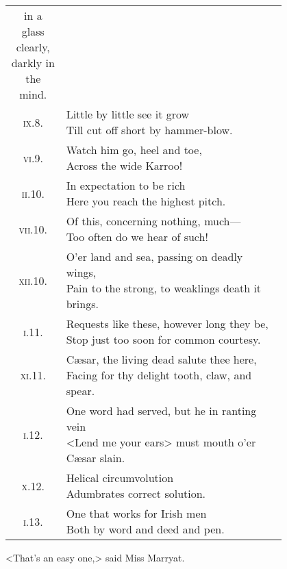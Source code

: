 \begin{longtable} {c p{0.8\linewidth}}
{in a glass clearly, darkly in the mind.}\\
\textsc{ix}.8. &  \makecell[l]{Little by little see it grow\\
Till cut off short by hammer-blow.}\\
\textsc{vi}.9. &  \makecell[l]{Watch him go, heel and toe,\\
Across the wide Karroo!}\\
\textsc{ii}.10. &  \makecell[l]{In expectation to be rich\\
Here you reach the highest pitch.}\\
\textsc{vii}.10. &  \makecell[l]{Of this, concerning nothing, much—\\
Too often do we hear of such!}\\
\textsc{xii}.10. &  \makecell[l]{O'er land and sea, passing on deadly wings,\\
Pain to the strong, to weaklings death it brings.}\\
\textsc{i}.11. &  \makecell[l]{Requests like these, however long they be,\\
Stop just too soon for common courtesy.}\\
\textsc{xi}.11. &  \makecell[l]{Cæsar, the living dead salute thee here,\\
Facing for thy delight tooth, claw, and spear.}\\
\textsc{i}.12. &  \makecell[l]{One word had served, but he in ranting vein\\
<Lend me your ears> must mouth o'er Cæsar slain.}\\
\textsc{x}.12. &  \makecell[l]{Helical circumvolution\\
Adumbrates correct solution.}\\
\textsc{i}.13. &  \makecell[l]{One that works for Irish men\\
Both by word and deed and pen.}\\
\end{longtable}

<That's an easy one,> said Miss Marryat.

